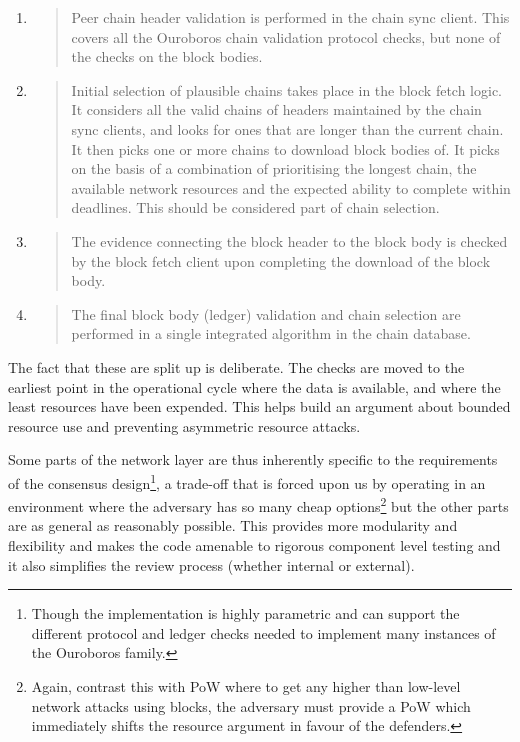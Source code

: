 \documentclass[]{article}
\begin{document}
\begin{enumerate}
\def\labelenumi{\arabic{enumi}.}
\item
  \begin{quote}
  Peer chain header validation is performed in the chain sync client.
  This covers all the Ouroboros chain validation protocol checks, but
  none of the checks on the block bodies.
  \end{quote}
\item
  \begin{quote}
  Initial selection of plausible chains takes place in the block fetch
  logic. It considers all the valid chains of headers maintained by the
  chain sync clients, and looks for ones that are longer than the
  current chain. It then picks one or more chains to download block
  bodies of. It picks on the basis of a combination of prioritising the
  longest chain, the available network resources and the expected
  ability to complete within deadlines. This should be considered part
  of chain selection.
  \end{quote}
\item
  \begin{quote}
  The evidence connecting the block header to the block body is checked
  by the block fetch client upon completing the download of the block
  body.
  \end{quote}
\item
  \begin{quote}
  The final block body (ledger) validation and chain selection are
  performed in a single integrated algorithm in the chain database.
  \end{quote}
\end{enumerate}

The fact that these are split up is deliberate. The checks are moved to
the earliest point in the operational cycle where the data is available,
and where the least resources have been expended. This helps build an
argument about bounded resource use and preventing asymmetric resource
attacks.

Some parts of the network layer are thus inherently specific to the
requirements of the consensus design\footnote{Though the implementation
  is highly parametric and can support the different protocol and ledger
  checks needed to implement many instances of the Ouroboros family.}, a
trade-off that is forced upon us by operating in an environment where
the adversary has so many cheap options\footnote{Again, contrast this
  with PoW where to get any higher than low-level network attacks using
  blocks, the adversary must provide a PoW which immediately shifts the
  resource argument in favour of the defenders.} but the other parts are
as general as reasonably possible. This provides more modularity and
flexibility and makes the code amenable to rigorous component level
testing and it also simplifies the review process (whether internal or
external).
\end{document}
